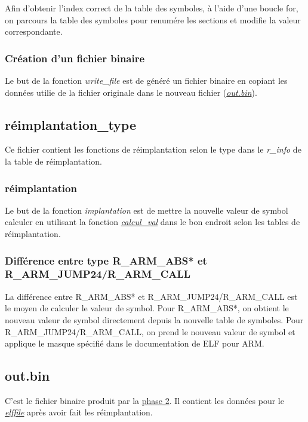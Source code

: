 \documentclass[a4paper]{article} %
\begin{document}
Afin d'obtenir l'index correct de la table des symboles, à l'aide d'une boucle for,
on parcours la table des symboles pour renumére les sections et modifie la valeur 
correspondante. 


\subsubsection*{Création d'un fichier binaire}
Le but de la fonction \textit{write\_file} est de généré un fichier binaire en 
copiant les données utilie de la fichier originale dans le nouveau fichier 
(\hyperref[sec:bin]{\textit{out.bin}}).

\subsection{réimplantation\_type}
Ce fichier contient les fonctions de réimplantation selon le type dans le \textit{r\_info}
de la table de réimplantation. 

\subsubsection*{réimplantation}
Le but de la fonction \textit{implantation} est de mettre la nouvelle valeur de symbol 
calculer en utilisant la fonction \hyperref[sec:calc]{\textit{calcul\_val}} dans le 
bon endroit selon les tables de réimplantation. 

\subsubsection*{Différence entre type R\_ARM\_ABS* et  R\_ARM\_JUMP24/R\_ARM\_CALL}
\label{sec:calc}

La différence entre R\_ARM\_ABS* et R\_ARM\_JUMP24/R\_ARM\_CALL est le moyen de 
calculer le valeur de symbol. Pour R\_ARM\_ABS*, on obtient le nouveau valeur de 
symbol directement depuis la nouvelle table de symboles. Pour 
R\_ARM\_JUMP24/R\_ARM\_CALL, on prend le nouveau valeur de symbol et applique le 
masque spécifié dans le documentation de ELF pour ARM. 

\subsection{out.bin}
\label{sec:bin}
C'est le fichier binaire produit par la \hyperref[sec:phase2]{phase 2}. Il 
contient les données pour le \hyperref[sec:elffile]{\textit{elffile}} après avoir fait 
les réimplantation. 
\end{document}
